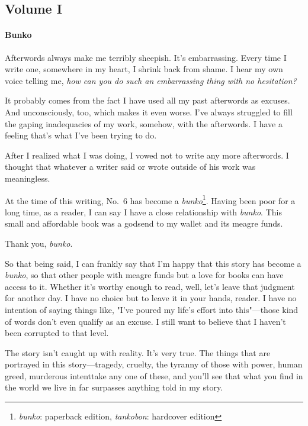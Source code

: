 
\clearpage
\subsection{Volume I}
\paragraph{Bunko}

Afterwords always make me terribly sheepish. It's embarrassing. Every
time I write one, somewhere in my heart, I shrink back from shame. I
hear my own voice telling me, \emph{how can you do such an embarrassing thing
with no hesitation?}

It probably comes from the fact I have used all my past afterwords as
excuses. And unconsciously, too, which makes it even worse. I've always
struggled to fill the gaping inadequacies of my work, somehow, with the
afterwords. I have a feeling that's what I've been trying to do.

After I realized what I was doing, I vowed not to write any more
afterwords. I thought that whatever a writer said or wrote outside of
his work was meaningless.

At the time of this writing, No.~6 has become a \emph{bunko}\footnote{\emph{bunko}: paperback edition, \emph{tankobon}: hardcover edition}.
Having been poor for a long time, as a reader, I can say I have a close
relationship with \emph{bunko}. This small and affordable book was a godsend to
my wallet and its meagre funds.

Thank you, \emph{bunko}.

So that being said, I can frankly say that I'm happy that this story has
become a \emph{bunko}, so that other people with meagre funds but a love for
books can have access to it. Whether it's worthy enough to read, well,
let's leave that judgment for another day. I have no choice but to leave
it in your hands, reader. I have no intention of saying things like,
"I've poured my life's effort into this"---those kind of words don't even
qualify as an excuse. I still want to believe that I haven't been
corrupted to that level.

The story isn't caught up with reality. It's very true. The things that
are portrayed in this story---tragedy, cruelty, the tyranny of those with
power, human greed, murderous intent\el take any one of these, and
you'll see that what you find in the world we live in far surpasses
anything told in my story.

